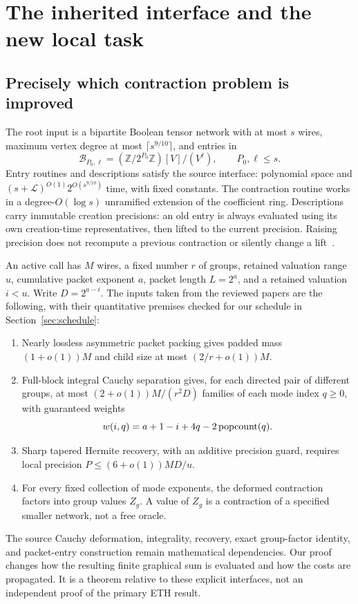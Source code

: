 \section{The inherited interface and the new local task}
\label{sec:interface}

\subsection{Precisely which contraction problem is improved}
The root input is a bipartite Boolean tensor network with at most $s$ wires,
maximum vertex degree at most $\lceil s^{9/10}\rceil$, and entries in
\[
 \mathcal B_{P_0,\ell}
   =(\mathbb Z/2^{P_0}\mathbb Z)[V]/(V^\ell),\qquad P_0,\ell\le s.
\]
Entry routines and descriptions satisfy the source interface: polynomial
space and $(s+\mathcal L)^{O(1)}2^{O(s^{9/10})}$ time, with fixed constants.
The contraction routine works in a degree-$O(\log s)$ unramified extension
of the coefficient ring. Descriptions carry immutable creation precisions:
an old entry is always evaluated using its own creation-time representatives,
then lifted to the current precision. Raising precision does not recompute a
previous contraction or silently change a lift~\cite{openai,asymmetric}.

An active call has $M$ wires, a fixed number $r$ of groups, retained valuation
range $u$, cumulative packet exponent $a$, packet length $L=2^a$, and a
retained valuation $i<u$. Write $D=2^{a-i}$. The inputs taken from the reviewed
papers are the following, with their quantitative premises checked for our
schedule in Section~\ref{sec:schedule}:
\begin{enumerate}
\item Nearly lossless asymmetric packet packing gives padded mass
$(1+o(1))M$ and child size at most $(2/r+o(1))M$.
\item Full-block integral Cauchy separation gives, for each directed pair
of different groups, at most $(2+o(1))M/(r^2D)$ families of each mode index
$q\ge0$, with guaranteed weights
\[
 w(i,q)=a+1-i+4q-2\operatorname{popcount}(q).
\]
\item Sharp tapered Hermite recovery, with an additive precision guard,
requires local precision $P\le(6+o(1))MD/u$.
\item For every fixed collection of mode exponents, the deformed contraction
factors into group values $Z_g$. A value of $Z_g$ is a contraction of a
specified smaller network, not a free oracle.
\end{enumerate}
The source Cauchy deformation, integrality, recovery, exact group-factor
identity, and packet-entry construction remain mathematical dependencies.
Our proof changes how the resulting finite graphical sum is evaluated and
how the costs are propagated. It is a theorem relative to these explicit
interfaces, not an independent proof of the primary ETH result.

